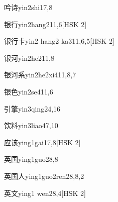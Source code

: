 \begin{entry}{吟诗}{yin2shi1}{7,8}
\end{entry}

\begin{entry}{银行}{yin2hang2}{11,6}[HSK 2]
\end{entry}

\begin{entry}{银行卡}{yin2 hang2 ka3}{11,6,5}[HSK 2]
\end{entry}

\begin{entry}{银河}{yin2he2}{11,8}
\end{entry}

\begin{entry}{银河系}{yin2he2xi4}{11,8,7}
\end{entry}

\begin{entry}{银色}{yin2se4}{11,6}
\end{entry}

\begin{entry}{引擎}{yin3qing2}{4,16}
\end{entry}

\begin{entry}{饮料}{yin3liao4}{7,10}
\end{entry}

\begin{entry}{应该}{ying1gai1}{7,8}[HSK 2]
\end{entry}

\begin{entry}{英国}{ying1guo2}{8,8}
\end{entry}

\begin{entry}{英国人}{ying1guo2ren2}{8,8,2}
\end{entry}

\begin{entry}{英文}{ying1 wen2}{8,4}[HSK 2]
\end{entry}


